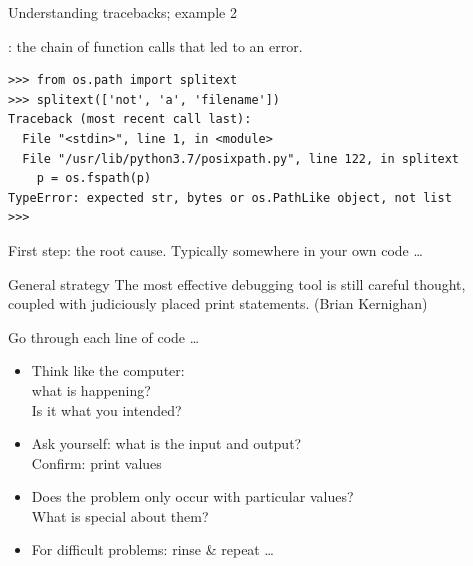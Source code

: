 \documentclass[aspectratio=169,usenames,dvipsnames]{beamer}
\begin{document}
\begin{frame}[fragile]{Understanding tracebacks; example 2}
\begin{definition}
    : the chain of function calls that led to an error.
\end{definition}
\begin{lstlisting}
>>> from os.path import splitext
>>> splitext(['not', 'a', 'filename'])
Traceback (most recent call last):
  File "<stdin>", line 1, in <module>
  File "/usr/lib/python3.7/posixpath.py", line 122, in splitext
    p = os.fspath(p)
TypeError: expected str, bytes or os.PathLike object, not list
>>>
\end{lstlisting}

First step:  the root cause.
Typically somewhere in your own code \dots
\end{frame}


\begin{frame}{General strategy}
    The most effective debugging tool is still careful thought, coupled with
    judiciously placed print statements. (Brian Kernighan)
    
    \pause\vspace{1em}
    Go through each line of code \dots
    \begin{itemize}
        \item Think like the computer: \\
            what is happening? \\
            Is it what you intended?
        \item Ask yourself: what is the input and output? \\
            Confirm: print values
        \item Does the problem only occur with particular values? \\
            What is special about them?
        \item For difficult problems: rinse \& repeat \dots
    \end{itemize}
\end{frame}
\end{document}

